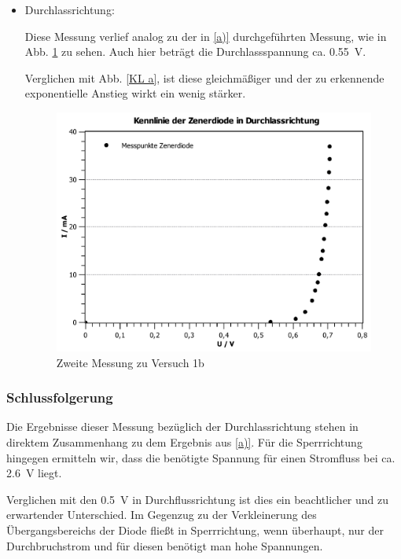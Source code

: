 \documentclass[11pt,a4paper,titlepage, ngerman]{article}
\begin{document}
\begin{itemize}
				 	\item Durchlassrichtung:  
				 	
				 	Diese Messung verlief analog zu der in \ref{a)} durchgeführten Messung, wie in Abb. \ref{KL b2} zu sehen.
				 	Auch hier beträgt die Durchlassspannung ca. \SI{0,55}{\V}.

				 	Verglichen mit Abb. \ref{KL a}, ist diese gleichmäßiger und der zu erkennende exponentielle Anstieg wirkt ein wenig stärker.
				 	
				 	\begin{figure}
				 		\centering
				 		\includegraphics[width=\textwidth]{KennlinieZenerdiodeDurchlassrichtung.pdf}
				 		\caption{Zweite Messung zu Versuch 1b}
				 		\label{KL b2}
				 	\end{figure}
				 					 	
				\end{itemize}
											
			\subsubsection*{Schlussfolgerung}
				
				Die Ergebnisse dieser Messung bezüglich der Durchlassrichtung stehen in direktem Zusammenhang zu dem Ergebnis aus \ref{a)}. 
				Für die Sperrrichtung hingegen ermitteln wir, dass die benötigte Spannung für einen Stromfluss bei ca. \SI{2.6}{\V} liegt. 
				
				Verglichen mit den \SI{0.5}{\V} in Durchflussrichtung ist dies ein beachtlicher und zu erwartender Unterschied.
				Im Gegenzug zu der Verkleinerung des Übergangsbereichs der Diode fließt in Sperrrichtung, wenn überhaupt, nur der Durchbruchstrom und für diesen benötigt man hohe Spannungen. 
				
\end{document}
